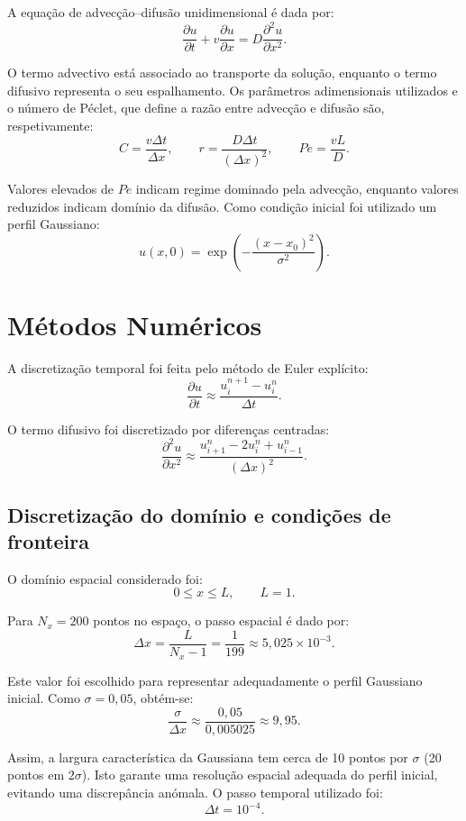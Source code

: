 \documentclass{article}
\begin{document}
A equação de advecção--difusão unidimensional é dada por:
\[
\frac{\partial u}{\partial t}
+
v \frac{\partial u}{\partial x}
=
D \frac{\partial^2 u}{\partial x^2}.
\]

O termo advectivo está associado ao transporte da solução, enquanto o termo difusivo representa o seu espalhamento. Os parâmetros adimensionais utilizados e o número de Péclet, que define a razão entre advecção e difusão são, respetivamente:
\[
C = \frac{v \Delta t}{\Delta x},\qquad r = \frac{D \Delta t}{(\Delta x)^2},\qquad Pe = \frac{v L}{D}.
\]

Valores elevados de \(Pe\) indicam regime dominado pela advecção, enquanto valores reduzidos indicam domínio da difusão. Como condição inicial foi utilizado um perfil Gaussiano:
\[
u(x,0) = \exp\left(-\frac{(x - x_0)^2}{\sigma^2}\right).
\]

\section{Métodos Numéricos}

A discretização temporal foi feita pelo método de Euler explícito:
\[
\frac{\partial u}{\partial t}
\approx
\frac{u_i^{n+1} - u_i^n}{\Delta t}.
\]

O termo difusivo foi discretizado por diferenças centradas:
\[
\frac{\partial^2 u}{\partial x^2}
\approx
\frac{u_{i+1}^n - 2u_i^n + u_{i-1}^n}{(\Delta x)^2}.
\]

\subsection{Discretização do domínio e condições de fronteira}

O domínio espacial considerado foi:
\[
0 \le x \le L, \qquad L = 1.
\]

Para \(N_x = 200\) pontos no espaço, o passo espacial é dado por:
\[
\Delta x = \frac{L}{N_x - 1}
= \frac{1}{199}
\approx 5{,}025 \times 10^{-3}.
\]

Este valor foi escolhido para representar adequadamente o perfil Gaussiano inicial. Como \(\sigma = 0{,}05\), obtém-se:
\[
\frac{\sigma}{\Delta x}
\approx
\frac{0{,}05}{0{,}005025}
\approx 9{,}95.
\]

Assim, a largura característica da Gaussiana tem cerca de 10 pontos por \(\sigma\) (20 pontos em \(2\sigma\)). Isto garante uma resolução espacial adequada do perfil inicial, evitando uma discrepância anómala. O passo temporal utilizado foi:
\[
\Delta t = 10^{-4}.
\]
\end{document}
